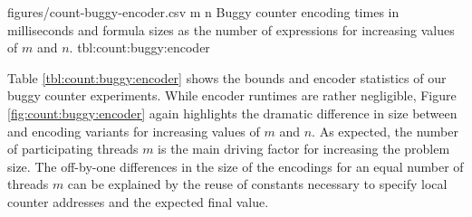 

\newcommand{\CountRowHeader}[1]{\StrSubstitute{#1}{ }{\hfill}}


\bigbreak

\EncoderStatsTable
  {figures/count-buggy-encoder.csv}
  {m n}
  {\CountRowHeader}
  {Buggy counter encoding times in milliseconds and formula sizes as the number of expressions for increasing values of $m$ and $n$.}
  {tbl:count:buggy:encoder}

Table \ref{tbl:count:buggy:encoder} shows the bounds and encoder statistics of our buggy counter experiments.
While encoder runtimes are rather negligible, Figure \ref{fig:count:buggy:encoder} again highlights the dramatic difference in size between {\BTOR} and {\SMTLIB} encoding variants for increasing values of $m$ and $n$. %
As expected, the number of participating threads $m$ is the main driving factor for
increasing the problem size.
The off-by-one differences in the size of the {\BTOR} encodings for an equal number of threads $m$ can be explained by the reuse of constants necessary to specify local counter addresses and the expected final value.

